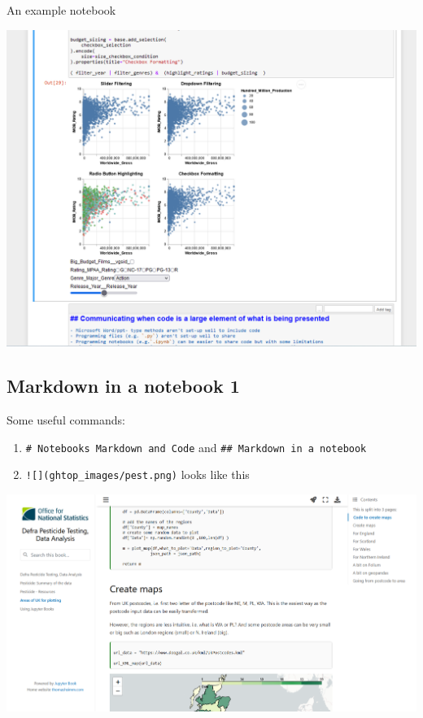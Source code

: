 \documentclass[
  letterpaper,
  DIV=11,
  numbers=noendperiod]{scrartcl}
\begin{document}
An example notebook

\includegraphics{ghtop_images/jupyter.png}

\hypertarget{markdown-in-a-notebook-1}{%
\subsection{Markdown in a notebook 1}\label{markdown-in-a-notebook-1}}

Some useful commands:

\begin{enumerate}
\def\labelenumi{\arabic{enumi}.}
\item
  \texttt{\#\ Notebooks\ Markdown\ and\ Code} and
  \texttt{\#\#\ Markdown\ in\ a\ notebook}
\item
  \texttt{!{[}{]}(ghtop\_images/pest.png)} looks like this
\end{enumerate}

\includegraphics{ghtop_images/pest.png}
\end{document}
